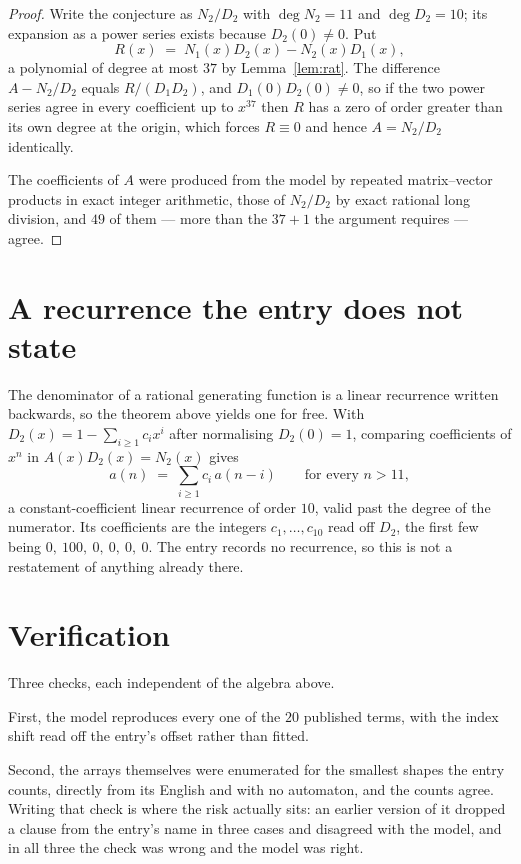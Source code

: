 \documentclass[11pt,a4paper]{article}
\theoremstyle{plain}
\theoremstyle{definition}
\begin{document}
\begin{proof}
Write the conjecture as $N_2/D_2$ with $\deg N_2=11$ and $\deg D_2=10$; its expansion as a
power series exists because $D_2(0)\neq0$. Put
\[
R(x)\;=\;N_1(x)D_2(x)-N_2(x)D_1(x),
\]
a polynomial of degree at most $37$ by Lemma~\ref{lem:rat}. The difference
$A-N_2/D_2$ equals $R/(D_1D_2)$, and $D_1(0)D_2(0)\neq0$, so if the two power series agree in
every coefficient up to $x^{37}$ then $R$ has a zero of order greater than its own
degree at the origin, which forces $R\equiv0$ and hence $A=N_2/D_2$ identically.

The coefficients of $A$ were produced from the model by repeated matrix--vector products in
exact integer arithmetic, those of $N_2/D_2$ by exact rational long division, and $49$
of them --- more than the $37+1$ the argument requires --- agree.
\end{proof}

\section{A recurrence the entry does not state}

The denominator of a rational generating function is a linear recurrence written backwards, so
the theorem above yields one for free. With $D_2(x)=1-\sum_{i\ge1}c_ix^i$ after normalising
$D_2(0)=1$, comparing coefficients of $x^n$ in $A(x)D_2(x)=N_2(x)$ gives
\[
a(n)\;=\;\sum_{i\ge1}c_i\,a(n-i)\qquad\text{for every }n>11,
\]
a constant-coefficient linear recurrence of order $10$, valid past the degree of the
numerator. Its coefficients are the integers $c_1,\dots,c_{10}$ read off $D_2$, the first few being $0,\ 100,\ 0,\ 0,\ 0,\ 0$. The entry records no recurrence, so this is not a restatement of anything
already there.

\section{Verification}

Three checks, each independent of the algebra above.

First, the model reproduces every one of the $20$ published terms, with the index shift
read off the entry's offset rather than fitted.

Second, the arrays themselves were enumerated for the smallest shapes the entry counts,
directly from its English and with no automaton, and the counts agree. Writing that check is
where the risk actually sits: an earlier version of it dropped a clause from the entry's name
in three cases and disagreed with the model, and in all three the check was wrong and the model
was right.
\end{document}
